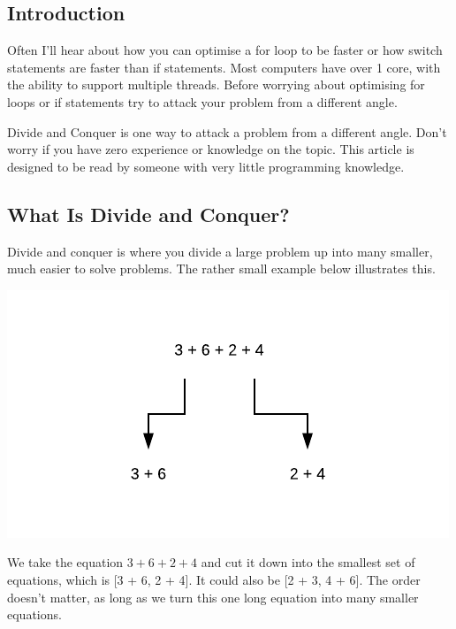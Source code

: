\documentclass{article}
\begin{document}
\subsection{Introduction}
Often I'll hear about how you can optimise a for loop to be faster or how switch statements are faster than if statements. Most computers have over 1 core, with the ability to support multiple threads. Before worrying about optimising for loops or if statements try to attack your problem from a different angle.

Divide and Conquer is one way to attack a problem from a different angle. Don't worry if you have zero experience or knowledge on the topic. This article is designed to be read by someone with very little programming knowledge.
\newpage
\subsection{What Is Divide and Conquer?}
Divide and conquer is where you divide a large problem up into many smaller, much easier to solve problems. The rather small example below illustrates this.
\begin{center}
\includegraphics[]{a.png}
\end{center}

We take the equation $3 + 6 + 2 + 4$ and cut it down into the smallest set of equations, which is [3 + 6, 2 + 4]. It could also be [2 + 3, 4 + 6]. The order doesn't matter, as long as we turn this one long equation into many smaller equations. 
\end{document}

